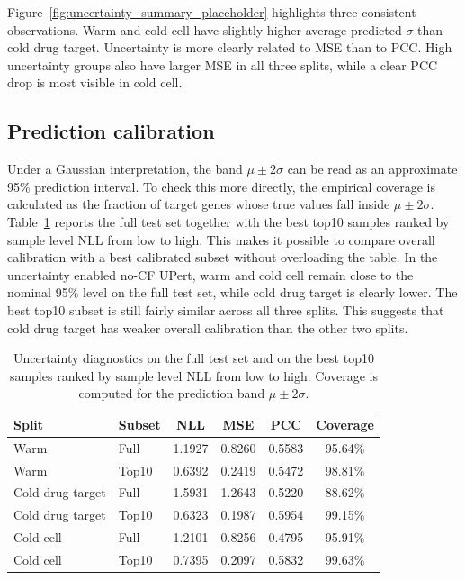 \noindent Figure~\ref{fig:uncertainty_summary_placeholder} highlights three consistent observations. Warm and cold cell have slightly higher average predicted $\sigma$ than cold drug target. Uncertainty is more clearly related to MSE than to PCC. High uncertainty groups also have larger MSE in all three splits, while a clear PCC drop is most visible in cold cell.

\subsection{Prediction calibration}
\noindent Under a Gaussian interpretation, the band $\mu \pm 2\sigma$ can be read as an approximate 95\% prediction interval. To check this more directly, the empirical coverage is calculated as the fraction of target genes whose true values fall inside $\mu \pm 2\sigma$. Table~\ref{tab:uncertainty_empirical_coverage} reports the full test set together with the best top10 samples ranked by sample level NLL from low to high. This makes it possible to compare overall calibration with a best calibrated subset without overloading the table. In the uncertainty enabled no-CF UPert, warm and cold cell remain close to the nominal 95\% level on the full test set, while cold drug target is clearly lower. The best top10 subset is still fairly similar across all three splits. This suggests that cold drug target has weaker overall calibration than the other two splits.

\begin{table}[htbp]
\centering
\caption[Uncertainty Diagnostics by Best NLL Subset]{Uncertainty diagnostics on the full test set and on the best top10 samples ranked by sample level NLL from low to high. Coverage is computed for the prediction band $\mu \pm 2\sigma$.}
\label{tab:uncertainty_empirical_coverage}
\begin{tabular}{llcccc}
\hline
Split & Subset & NLL & MSE & PCC & Coverage \\
\hline
Warm & Full & 1.1927 & 0.8260 & 0.5583 & 95.64\% \\
Warm & Top10 & 0.6392 & 0.2419 & 0.5472 & 98.81\% \\
\hline
Cold drug target & Full & 1.5931 & 1.2643 & 0.5220 & 88.62\% \\
Cold drug target & Top10 & 0.6323 & 0.1987 & 0.5954 & 99.15\% \\
\hline
Cold cell & Full & 1.2101 & 0.8256 & 0.4795 & 95.91\% \\
Cold cell & Top10 & 0.7395 & 0.2097 & 0.5832 & 99.63\% \\
\hline
\end{tabular}
\end{table}

